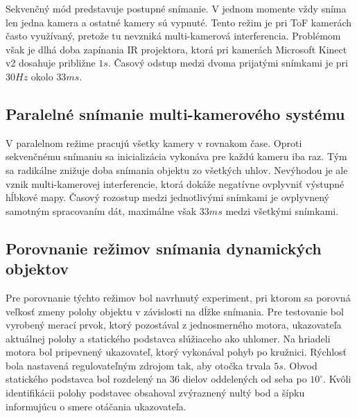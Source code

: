 Sekvenčný mód predstavuje postupné snímanie. V jednom momente vždy sníma len jedna kamera a ostatné kamery sú vypnuté. Tento režim je pri ToF kamerách často využívaný, pretože tu nevzniká multi-kamerová interferencia. Problémom však je dlhá doba zapínania IR projektora, ktorá pri kamerách Microsoft Kinect v2 dosahuje približne $1s$. Časový odstup medzi dvoma prijatými snímkami je pri $30Hz$ okolo $33ms$.

\subsection{Paralelné snímanie multi-kamerového systému}

V paralelnom režime pracujú všetky kamery v rovnakom čase. Oproti sekvenčnému snímaniu sa inicializácia vykonáva pre každú kameru iba raz. Tým sa radikálne znižuje doba snímania objektu zo všetkých uhlov. Nevýhodou je ale vznik multi-kamerovej interferencie, ktorá dokáže negatívne ovplyvniť výstupné hĺbkové mapy. Časový rozostup medzi jednotlivými snímkami je ovplyvnený samotným spracovaním dát, maximálne však $33ms$ medzi všetkými snímkami. 

\subsection{Porovnanie režimov snímania dynamických objektov}
\label{sec:serial_parallel}
Pre porovnanie týchto režimov bol navrhnutý experiment, pri ktorom sa porovná veľkosť zmeny polohy objektu v závislosti na dĺžke snímania. Pre testovanie bol vyrobený merací prvok, ktorý pozostával z jednosmerného motora, ukazovateľa aktuálnej polohy a statického podstavca slúžiaceho ako uhlomer. Na hriadeli motora bol pripevnený ukazovateľ, ktorý vykonával pohyb po kružnici. Rýchlosť bola nastavená regulovateľným zdrojom tak, aby otočka trvala $5s$. Obvod statického podstavca bol rozdelený na 36 dielov oddelených od seba po $10^\circ$. Kvôli identifikácii polohy podstavec obsahoval zvýraznený nultý bod a šípku informujúcu o smere otáčania ukazovateľa.  


